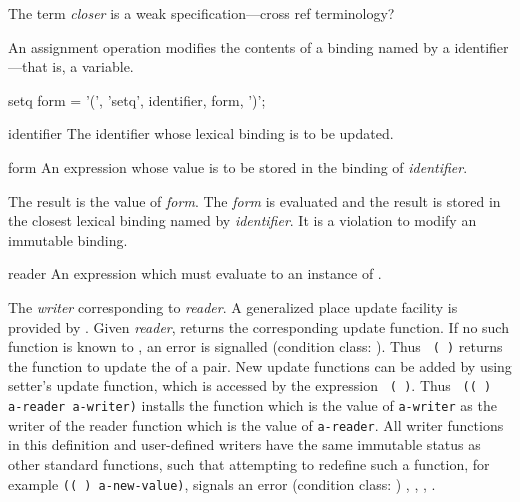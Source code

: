 %
\begin{optPrivate}
    The term {\em closer} is a weak specification---cross ref terminology?
\end{optPrivate}
%
\begin{optDefinition}
\noindent
An assignment operation modifies the contents of a
binding named by a identifier---that is, a variable.

%
\Syntax
\savesyntax\setqSyntax\vbox{\small\syntax
setq form
   = '(', 'setq', identifier, form, ')';
\endsyntax}
%
\begin{arguments}
    \item[identifier] The identifier whose lexical binding is to be updated.

    \item[form] An expression whose value is to be stored in the binding of {\em
        identifier}.
\end{arguments}
%
\result%
The result is the value of {\em form}.
%
\remarks%
The {\em form} is evaluated and the result is stored in the closest lexical
binding named by {\em identifier}.  It is a violation to modify an immutable
binding.

%
\begin{arguments}
    \item[reader] An expression which must evaluate to an instance of
    .
\end{arguments}
%
\result%
The {\em writer\/} corresponding to {\em reader}.
%
\remarks%
A generalized place update facility is provided by .  Given
{\em reader},  returns the
corresponding update function.  If no such
function is known to , an error is signalled (condition
class: ).  Thus {\tt
    ( )} returns the function to update the
 of a pair.  New update functions can be added by using
{setter}'s update function, which is accessed by the expression {\tt
    ( )}.  Thus {\tt
    (( ) a-reader a-writer)} installs
the function which is the value of {\tt a-writer} as the writer of the reader
function which is the value of {\tt a-reader}.  All writer functions in this
definition and user-defined writers have the same immutable status as other
standard functions, such that attempting to redefine such a function, for
example {\tt (( ) 
    a-new-value)}, signals an error (condition class:
)
%
\seealso%
, , ,
.


\end{optDefinition}

